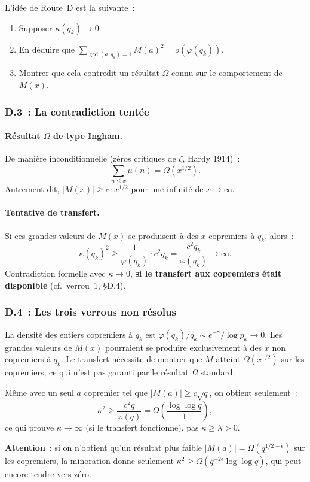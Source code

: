 L'id\'ee de Route~D est la suivante~:
\begin{enumerate}
\item Supposer $\kappa(q_k)\to 0$.
\item En d\'eduire que $\sum_{\gcd(a,q_k)=1}M(a)^2 = o(\varphi(q_k))$.
\item Montrer que cela contredit un r\'esultat $\Omega$ connu
      sur le comportement de $M(x)$.
\end{enumerate}

\subsubsection{D.3~: La contradiction tent\'ee}

\paragraph{R\'esultat $\Omega$ de type Ingham.}
De mani\`ere inconditionnelle (z\'eros critiques de $\zeta$,
Hardy 1914)~:
\[
\sum_{n\le x}\mu(n) = \Omega(x^{1/2}).
\]
Autrement dit, $|M(x)|\ge c\cdot x^{1/2}$ pour une infinit\'e
de $x\to\infty$.

\paragraph{Tentative de transfert.}
Si ces grandes valeurs de $M(x)$ se produisent \`a des $x$
copremiers \`a $q_k$, alors~:
\[
\kappa(q_k)^2 \ge \frac{1}{\varphi(q_k)}\cdot c^2 q_k
= \frac{c^2 q_k}{\varphi(q_k)} \to \infty.
\]
Contradiction formelle avec $\kappa\to 0$,
\textbf{si le transfert aux copremiers \'etait disponible}
(cf.~verrou~1, \S D.4).

\subsubsection{D.4~: Les trois verrous non r\'esolus}

\begin{remark}\label{rem:V1}
La densit\'e des entiers copremiers \`a $q_k$ est
$\varphi(q_k)/q_k \sim e^{-\gamma}/\log p_k \to 0$.
Les grandes valeurs de $M(x)$ pourraient se produire exclusivement
\`a des $x$ non copremiers \`a $q_k$. Le transfert n\'ecessite de
montrer que $M$ atteint $\Omega(x^{1/2})$ sur les copremiers,
ce qui n'est pas garanti par le r\'esultat $\Omega$ standard.
\end{remark}

\begin{remark}\label{rem:V2}
M\^eme avec un seul $a$ copremier tel que $|M(a)|\ge c\sqrt{q}$,
on obtient seulement~:
\[
\kappa^2 \ge \frac{c^2 q}{\varphi(q)} = O\!\left(\frac{\log\log q}{1}\right),
\]
ce qui prouve $\kappa\to\infty$ (si le transfert fonctionne),
pas $\kappa\ge\lambda>0$.

\textbf{Attention}~: si on n'obtient qu'un r\'esultat plus faible
$|M(a)|=\Omega(q^{1/2-\epsilon})$ sur les copremiers, la minoration
donne seulement $\kappa^2\ge\Omega(q^{-2\epsilon}\log\log q)$,
qui peut encore tendre vers z\'ero.
\end{remark}

